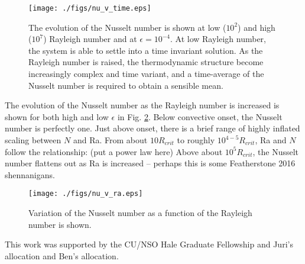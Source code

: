 \documentclass[aps, prl, twocolumn, groupedaddress]{revtex4-1}
\begin{document}
\begin{figure}[t]
\texttt{[image: ./figs/nu\_v\_time.eps]}
\caption{The evolution of the Nusselt number is shown at low ($10^2$) and high ($10^7$) Rayleigh number and at
$\epsilon = 10^{-4}$.  At low Rayleigh number, the system is able to settle into a time invariant solution. As
the Rayleigh number is raised, the thermodynamic structure become increasingly complex and time variant, and a
time-average of the Nusselt number is required to obtain a sensible mean.
\label{fig:nu_v_time} }
\end{figure}

The evolution of the Nusselt number as the Rayleigh number is increased is shown for both high and low
$\epsilon$ in Fig. \ref{fig:nu_v_ra}.  Below convective onset, the Nusselt number is perfectly one. Just above
onset, there is a brief range of highly inflated scaling between $N$ and Ra.  From about $10R_{crit}$ to roughly
$10^{4-5}R_{crit}$, Ra and $N$ follow the relationship: (put a power law here)  Above about
$10^5 R_{crit}$, the Nusselt number flattens out as Ra is increased -- perhaps this is some Featherstone 2016
shennanigans.

\begin{figure}[b]
\texttt{[image: ./figs/nu\_v\_ra.eps]}
\caption{Variation of the Nusselt number as a function of the Rayleigh number is shown.
\label{fig:nu_v_ra} }
\end{figure}




\begin{acknowledgements}
This work was supported by the CU/NSO Hale Graduate Fellowship and Juri's allocation and Ben's allocation.
\end{acknowledgements}


\end{document}
